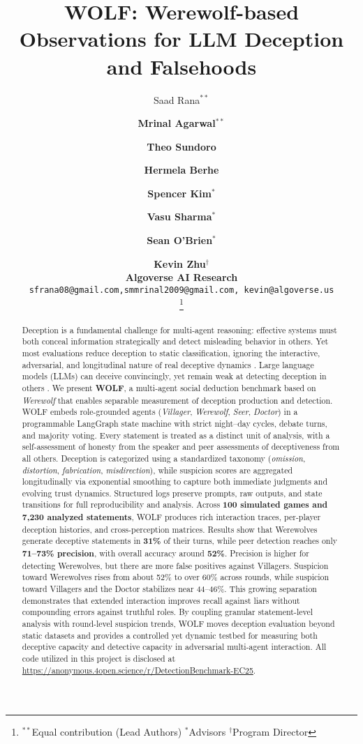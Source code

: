 \documentclass{article}
\title{WOLF: Werewolf-based Observations for LLM Deception and Falsehoods}
\author{
  Saad Rana$^{**}$
  \and
  \textbf{Mrinal Agarwal}$^{**}$
  \and
  \textbf{Theo Sundoro}
  \and
  \textbf{Hermela Berhe}
  \and
  \textbf{Spencer Kim}$^{*}$
  \and
  \textbf{Vasu Sharma}$^{*}$
  \and
  \textbf{Sean O'Brien}$^{*}$
  \and
  \textbf{Kevin Zhu}$^{\dagger}$
  \vspace{1em} \\ 
  \textbf{Algoverse AI Research} \\
  \texttt{sfrana08@gmail.com,smmrinal2009@gmail.com, kevin@algoverse.us} \\
  \thanks{\protect$^{**}$Equal contribution (Lead Authors) \quad
          \protect$^{*}$Advisors \quad
          \protect$^{\dagger}$Program Director}
}
\begin{document}
\maketitle

\begin{abstract}
Deception is a fundamental challenge for multi-agent reasoning: effective systems must both conceal information strategically and detect misleading behavior in others. Yet most evaluations reduce deception to static classification, ignoring the interactive, adversarial, and longitudinal nature of real deceptive dynamics \cite{haase2025staticresponsesmultiagentllm}. Large language models (LLMs) can deceive convincingly, yet remain weak at detecting deception in others \cite{curvo2025traitorsdeceptiontrustmultiagent}. We present \textbf{WOLF}, a multi-agent social deduction benchmark based on \emph{Werewolf} that enables separable measurement of deception production and detection. WOLF embeds role-grounded agents (\emph{Villager}, \emph{Werewolf}, \emph{Seer}, \emph{Doctor}) in a programmable LangGraph state machine with strict night--day cycles, debate turns, and majority voting. Every statement is treated as a distinct unit of analysis, with a self-assessment of honesty from the speaker and peer assessments of deceptiveness from all others. Deception is categorized using a standardized taxonomy (\emph{omission}, \emph{distortion}, \emph{fabrication}, \emph{misdirection}), while suspicion scores are aggregated longitudinally via exponential smoothing to capture both immediate judgments and evolving trust dynamics. Structured logs preserve prompts, raw outputs, and state transitions for full reproducibility and analysis. Across \textbf{100 simulated games and 7,230 analyzed statements}, WOLF produces rich interaction traces, per-player deception histories, and cross-perception matrices. Results show that Werewolves generate deceptive statements in \textbf{31\%} of their turns, while peer detection reaches only \textbf{71--73\% precision}, with overall accuracy around \textbf{52\%}. Precision is higher for detecting Werewolves, but there are more false positives against Villagers. Suspicion toward Werewolves rises from about 52\% to over 60\% across rounds, while suspicion toward Villagers and the Doctor stabilizes near 44--46\%. This growing separation demonstrates that extended interaction improves recall against liars without compounding errors against truthful roles. By coupling granular statement-level analysis with round-level suspicion trends, WOLF moves deception evaluation beyond static datasets and provides a controlled yet dynamic testbed for measuring both deceptive capacity and detective capacity in adversarial multi-agent interaction. All code utilized in this project is disclosed at \url{https://anonymous.4open.science/r/DetectionBenchmark-EC25}.
\end{abstract}
\end{document}
